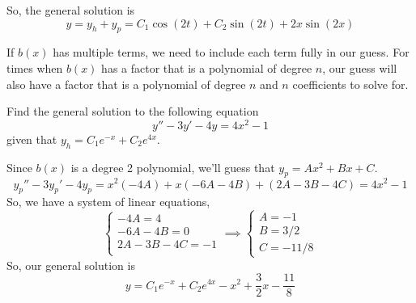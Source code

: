 \noindent
So, the general solution is
\begin{equation*}
	y = y_h + y_p = C_1\cos{(2t)} + C_2\sin{(2t)} + 2x\sin{(2x)}
\end{equation*}

\noindent
If $b(x)$ has multiple terms, we need to include each term fully in our guess. For times when $b(x)$ has a factor that is a polynomial of degree $n$, our guess will also have a factor that is a polynomial of degree $n$ and $n$ coefficients to solve for.
\begin{example}
	Find the general solution to the following equation
	\begin{equation*}
		y'' - 3y' - 4y = 4x^2 - 1
	\end{equation*}
	given that $y_h = C_1e^{-x} + C_2e^{4x}$.
\end{example}
\noindent
Since $b(x)$ is a degree 2 polynomial, we'll guess that $y_p = Ax^2 + Bx + C$.
\begin{equation*}
	y_p'' - 3y_p' - 4y_p = x^2(-4A) + x(-6A-4B) + (2A-3B-4C) = 4x^2 - 1
\end{equation*}
So, we have a system of linear equations,
\begin{equation*}
	\begin{cases}
		-4A = 4 \\
		-6A - 4B = 0 \\
		2A - 3B - 4C = -1 \\
	\end{cases} \implies \begin{cases}
		A = -1 \\
		B = 3/2 \\
		C = -11/8
	\end{cases}
\end{equation*}
So, our general solution is
\begin{equation*}
	y = C_1e^{-x} + C_2e^{4x} - x^2 + \frac{3}{2}x - \frac{11}{8}
\end{equation*}